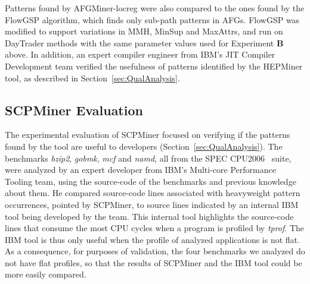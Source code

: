 Patterns found by AFGMiner-locreg were also compared to the ones found by the FlowGSP algorithm, which finds only sub-path patterns in AFGs. FlowGSP was modified to support variations in MMH, MinSup and MaxAttrs, and run on DayTrader methods with the same parameter values used for Experiment {\bf B} above. In addition, an expert compiler engineer from IBM's JIT Compiler Development team verified the usefulness of patterns identified by the HEPMiner tool, as described in Section~\ref{sec:QualAnalysis}.

\subsection{SCPMiner Evaluation}
The experimental evaluation of SCPMiner focused on verifying if the patterns found by the tool are useful to developers (Section~\ref{sec:QualAnalysis}). The benchmarks \emph{bzip2}, \emph{gobmk}, \emph{mcf} and \emph{namd}, all from the SPEC CPU2006~\cite{SPEC} suite, were analyzed by an expert developer from IBM's Multi-core Performance Tooling team, using the source-code of the benchmarks and previous knowledge about them. He compared source-code lines associated with heavyweight pattern occurrences, pointed by SCPMiner, to source lines indicated by an internal IBM tool being developed by the team. This internal tool highlights the source-code lines that consume the most CPU cycles when a program is profiled by \emph{tprof}. The IBM tool is thus only useful when the profile of analyzed applications is not flat. As a consequence, for purposes of validation, the four benchmarks we analyzed do not have flat profiles, so that the results of SCPMiner and the IBM tool could be more easily compared.







